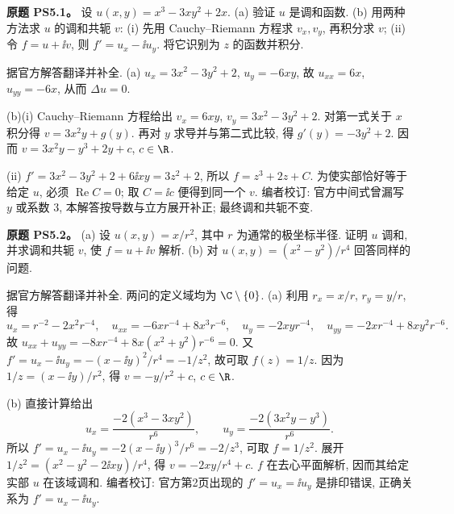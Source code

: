 
\begin{exercise}
\textbf{原题 PS5.1。}\label{ass:ps5-1}
设 $u(x,y)=x^3-3xy^2+2x$.
(a) 验证 $u$ 是调和函数.
(b) 用两种方法求 $u$ 的调和共轭 $v$: (i) 先用 Cauchy--Riemann 方程求 $v_x,v_y$, 再积分求 $v$; (ii) 令 $f=u+\ii v$, 则 $f'=u_x-\ii u_y$. 将它识别为 $z$ 的函数并积分.
\end{exercise}
\begin{solution}
据官方解答翻译并补全.
(a) $u_x=3x^2-3y^2+2$, $u_y=-6xy$, 故 $u_{xx}=6x$, $u_{yy}=-6x$, 从而 $\Delta u=0$.

(b)(i) Cauchy--Riemann 方程给出 $v_x=6xy$, $v_y=3x^2-3y^2+2$. 对第一式关于 $x$ 积分得 $v=3x^2y+g(y)$. 再对 $y$ 求导并与第二式比较, 得 $g'(y)=-3y^2+2$. 因而 $v=3x^2y-y^3+2y+c$, $c\in\R$.

(ii) $f'=3x^2-3y^2+2+6\ii xy=3z^2+2$, 所以 $f=z^3+2z+C$. 为使实部恰好等于给定 $u$, 必须 $\operatorname{Re}C=0$; 取 $C=\ii c$ 便得到同一个 $v$. 编者校订: 官方中间式曾漏写 $y$ 或系数 $3$, 本解答按导数与立方展开补正; 最终调和共轭不变.
\end{solution}

\begin{exercise}
\textbf{原题 PS5.2。}\label{ass:ps5-2}
(a) 设 $u(x,y)=x/r^2$, 其中 $r$ 为通常的极坐标半径. 证明 $u$ 调和, 并求调和共轭 $v$, 使 $f=u+\ii v$ 解析.
(b) 对 $u(x,y)=(x^2-y^2)/r^4$ 回答同样的问题.
\end{exercise}
\begin{solution}
据官方解答翻译并补全. 两问的定义域均为 $\C\setminus\{0\}$.
(a) 利用 $r_x=x/r$, $r_y=y/r$, 得
\[
 u_x=r^{-2}-2x^2r^{-4},\quad u_{xx}=-6xr^{-4}+8x^3r^{-6},\quad
 u_y=-2xyr^{-4},\quad u_{yy}=-2xr^{-4}+8xy^2r^{-6}.
\]
故 $u_{xx}+u_{yy}=-8xr^{-4}+8x(x^2+y^2)r^{-6}=0$.
又 $f'=u_x-\ii u_y=-(x-\ii y)^2/r^4=-1/z^2$, 故可取 $f(z)=1/z$. 因为 $1/z=(x-\ii y)/r^2$, 得 $v=-y/r^2+c$, $c\in\R$.

(b) 直接计算给出
\[
 u_x=\frac{-2(x^3-3xy^2)}{r^6},\qquad
 u_y=\frac{-2(3x^2y-y^3)}{r^6}.
\]
所以 $f'=u_x-\ii u_y=-2(x-\ii y)^3/r^6=-2/z^3$, 可取 $f=1/z^2$. 展开 $1/z^2=(x^2-y^2-2\ii xy)/r^4$, 得 $v=-2xy/r^4+c$. $f$ 在去心平面解析, 因而其给定实部 $u$ 在该域调和. 编者校订: 官方第2页出现的 $f'=u_x=\ii u_y$ 是排印错误, 正确关系为 $f'=u_x-\ii u_y$.
\end{solution}

